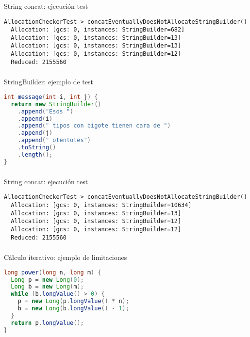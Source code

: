 \begin{frame}[fragile]
  \frametitle{\ft}
  \begin{block}{String concat: ejecución test}
    \begin{lstlisting}
AllocationCheckerTest > concatEventuallyDoesNotAllocateStringBuilder()
  Allocation: [gcs: 0, instances: StringBuilder=682]
  Allocation: [gcs: 0, instances: StringBuilder=13]
  Allocation: [gcs: 0, instances: StringBuilder=13]
  Allocation: [gcs: 0, instances: StringBuilder=12]
  Reduced: 2155560
    \end{lstlisting}
  \end{block}
\end{frame}


\begin{frame}[fragile]
  \frametitle{\ft}
  \begin{block}{StringBuilder: ejemplo de test}
    \begin{lstlisting}[language=java]
int message(int i, int j) {
  return new StringBuilder()
    .append("Esos ")
    .append(i)
    .append(" tipos con bigote tienen cara de ")
    .append(j)
    .append(" otentotes")
    .toString()
    .length();
}
    \end{lstlisting}
  \end{block}
\end{frame}

\begin{frame}[fragile]
  \frametitle{\ft}
  \begin{block}{String concat: ejecución test}
    \begin{lstlisting}
AllocationCheckerTest > concatEventuallyDoesNotAllocateStringBuilder()
  Allocation: [gcs: 0, instances: StringBuilder=10634]
  Allocation: [gcs: 0, instances: StringBuilder=13]
  Allocation: [gcs: 0, instances: StringBuilder=12]
  Allocation: [gcs: 0, instances: StringBuilder=12]
  Reduced: 2155560
    \end{lstlisting}
  \end{block}
\end{frame}


\begin{frame}[fragile]
  \frametitle{\ft}
  \begin{block}{Cálculo iterativo: ejemplo de limitaciones}
    \begin{lstlisting}[language=java]
long power(long n, long m) {
  Long p = new Long(0);
  Long b = new Long(m);
  while (b.longValue() > 0) {
    p = new Long(p.longValue() * n);
    b = new Long(b.longValue() - 1);
  }
  return p.longValue();
}
    \end{lstlisting}
  \end{block}
\end{frame}

